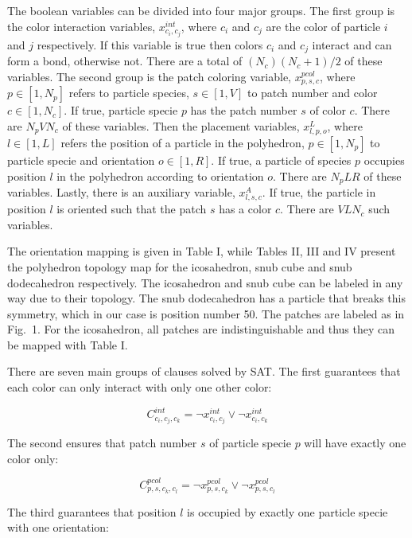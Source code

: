 \documentclass[a4paper, amsfonts, amssymb, amsmath, reprint, showkeys, nofootinbib, oneside]{revtex4-1}
\begin{document}
The boolean variables can be divided into four major groups. The first group is the color interaction variables, $x_{c_i,c_j}^{int}$, where $c_i$ and $c_j$ are the color of particle $i$ and $j$ respectively. If this variable is true then colors $c_i$ and $c_j$ interact and can form a bond, otherwise not. There are a total of $(N_c)(N_c+1)/2$ of these variables. The second group is the patch coloring variable, $x_{p,s,c}^{pcol}$, where $p\in [1, N_p]$ refers to particle species, $s\in [1, V]$ to patch number and color $c\in [1, N_c]$. If true, particle specie $p$ has the patch number $s$ of color $c$. There are $N_pVN_c$ of these variables. Then the placement variables, $x_{l,p,o}^{L}$, where $l\in [1, L]$ refers the position of a particle in the polyhedron, $p\in [1, N_p]$ to particle specie and orientation $o\in [1, R]$. If true, a particle of species $p$ occupies position $l$ in the polyhedron according to orientation $o$. There are $N_pLR$ of these variables. Lastly, there is an auxiliary variable, $x_{l,s,c}^{A}$. If true, the particle in position $l$ is oriented such that the patch $s$ has a color $c$. There are $VLN_c$ such variables.

The orientation mapping is given in Table I, while Tables II, III and IV present the polyhedron topology map for the icosahedron, snub cube and snub dodecahedron respectively. The icosahedron and snub cube can be labeled in any way due to their topology. The snub dodecahedron has a particle that breaks this symmetry, which in our case is position number 50. The patches are labeled as in Fig.~1. For the icosahedron, all patches are indistinguishable and thus they can be mapped with Table I.

There are seven main groups of clauses solved by SAT. The first guarantees that each color can only interact with only one other color:

\begin{equation}
C^{int}_{c_i,c_j,c_k}=\neg x_{c_i,c_j}^{int} \vee \neg x_{c_i,c_k}^{int}
\end{equation}

The second ensures that patch number $s$ of particle specie $p$ will have exactly one color only:

\begin{equation}
C^{pcol}_{p,s,c_k,c_l}=\neg x_{p,s,c_k}^{pcol} \vee \neg x_{p,s,c_l}^{pcol}
\end{equation}

The third guarantees that position $l$ is occupied by exactly one particle specie with one orientation:
\end{document}
